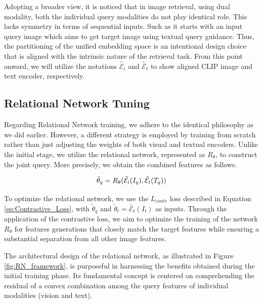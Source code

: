 \documentclass[10pt,lineno]{wlpeerj}
\begin{document}
Adopting a broader view, it is noticed that in image retrieval, using dual modality, both the individual query modalities do not play identical role. This lacks symmetry in terms of sequential inputs. Such as it starts with an input query image which aims to get target image using textual query guidance. Thus, the partitioning of the unified embedding space is an intentional design choice that is aligned with the intrinsic nature of the retrieval task. From this point onward, we will utilize the notations $\tilde{\mathcal{E}_i}$ and $\tilde{\mathcal{E}_t}$ to show aligned CLIP image and text encoder, respectively.

\subsection*{Relational Network Tuning}\label{sec:Clip_Encoders}
Regarding Relational Network training, we adhere to the identical philosophy as we did earlier. However, a different strategy is employed by training from scratch rather than just adjusting the weights of both visual and textual encoders. Unlike the initial stage, we utilize the relational network, represented as $R_\theta$, to construct the joint query. More precisely, we obtain the combined features as follows.

\begin{equation}
    \centering
    \tilde \theta_q = R_\theta(\tilde{\mathcal{E}_i}(I_q),\tilde{\mathcal{E}_t}(T_q))
\label{eq:thetha_q}
\end{equation}


To optimize the relational network, we use the $L_{contr}$ loss described in Equation \ref{eq:Contrastive_Loss}, with $\tilde\theta_q$ and $\tilde\theta_t = \tilde{\mathcal{E}_t}(I_t)$ as inputs. Through the application of the contrastive loss, we aim to optimize the training of the network $R_{\theta}$ for features generations that closely match the target features while ensuring a substantial separation from all other image features.

The architectural design of the relational network, as illustrated in Figure \ref{fig:RN_framework}, is purposeful in harnessing the benefits obtained during the initial training phase. Its fundamental concept is centered on comprehending the residual of a convex combination among the query features of individual modalities (vision and text).
\end{document}
